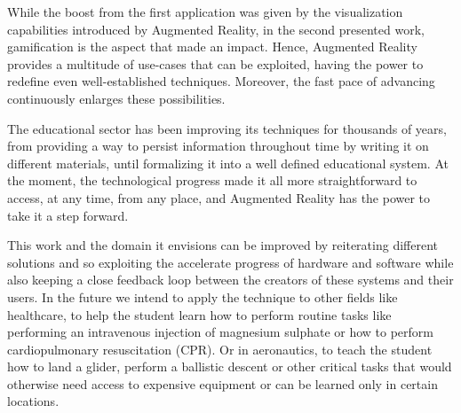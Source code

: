 \documentclass[12 pct]{report}
\begin{document}
While the boost from the first application was given by the visualization capabilities introduced by Augmented Reality, in the second presented work, gamification is the aspect that made an impact. 
Hence, Augmented Reality provides a multitude of use-cases that can be exploited, having the power to redefine even well-established techniques. 
Moreover, the fast pace of advancing continuously enlarges these possibilities.

The educational sector has been improving its techniques for thousands of years, from providing a way to persist information throughout time by writing it on different materials, until formalizing it into a well defined educational system. 
At the moment, the technological progress made it all more straightforward to access, at any time, from any place, and Augmented Reality has the power to take it a step forward.

This work and the domain it envisions can be improved by reiterating different solutions and so exploiting the accelerate progress of hardware and software while also keeping a close feedback loop between the creators of these systems and their users.
In the future we intend to apply the technique to other fields like healthcare, to help the student learn how to perform routine tasks like performing an intravenous injection of magnesium sulphate or how to perform cardiopulmonary resuscitation (CPR). 
Or in aeronautics, to teach the student how to land a glider, perform a ballistic descent or other critical tasks that would otherwise need access to expensive equipment or can be learned only in certain locations.



 
\end{document}
